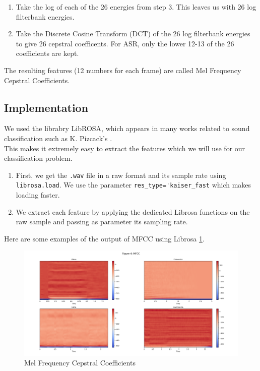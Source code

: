\documentclass{article} %
\begin{document}
\begin{enumerate}
	  	\item Take the log of each of the 26 energies from step 3. This leaves us with 26 log filterbank energies.

		\item Take the Discrete Cosine Transform (DCT) of the 26 log filterbank energies to give 26 cepstral coefficents. For ASR, only the lower 12-13 of the 26 coefficients are kept.

	\end{enumerate}
	The resulting features (12 numbers for each frame) are called Mel Frequency Cepstral Coefficients.

	\subsection{Implementation}
		We used the librabry LibROSA, which appears in many works related to sound classification such as K. Pizcack's \cite{cite2}.\\
		This makes it extremely easy to extract the features which we will use for our classification problem.

		\begin{enumerate}
			\item First, we get the \verb+.wav+ file in a raw format and its sample rate using \verb+librosa.load+. We use the parameter \verb+res_type='kaiser_fast+ which makes loading faster.
			\item We extract each feature by applying the dedicated Librosa functions on the raw sample and passing as parameter its sampling rate.
		\end{enumerate}
		Here are some examples of the output of MFCC using Librosa \ref{fig:mfccgraph}.
		\begin{figure}[H]
		  \includegraphics[width=\linewidth]{mfcc.png}
		  \caption{Mel Frequency Cepstral Coefficients}
		  \label{fig:mfccgraph}
		\end{figure}
        
\end{document}
